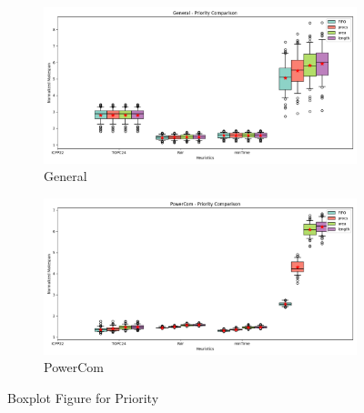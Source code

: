 \documentclass{article}
\begin{document}
\begin{figure}[htbp]
\\[2ex]
\begin{subfigure}[b]{0.32\textwidth}\includegraphics[width=\textwidth]{Results/Priority/Priority_General_boxplot}\caption{General}\label{fig:boxplot_figures_Priority_General}\end{subfigure}
\hfill
\begin{subfigure}[b]{0.32\textwidth}\includegraphics[width=\textwidth]{Results/Priority/Priority_PowerCom_boxplot}\caption{PowerCom}\label{fig:boxplot_figures_Priority_PowerCom}\end{subfigure}
\hfill
\caption{Boxplot Figure for Priority}
\label{fig:boxplot_figures_Priority}
\end{figure}
\end{document}
